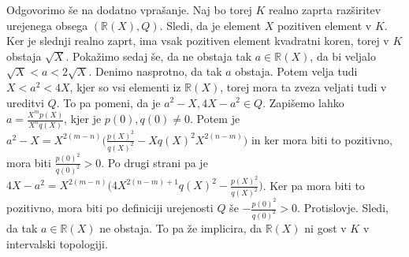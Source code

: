 \documentclass[a4paper, 12pt]{article}
\newcommand{\R}{\mathbb{R}}
\begin{document}
\begin{enumerate}
Odgovorimo še na dodatno vprašanje. Naj bo torej $K$ realno zaprta razširitev urejenega obsega $(\R(X), Q)$. Sledi, da je element $X$ pozitiven element v $K$. Ker je slednji realno zaprt, ima vsak pozitiven element kvadratni koren, torej v $K$ obstaja $\sqrt{X}$. Pokažimo sedaj še, da ne obstaja tak $a\in \R(X)$, da bi veljalo $\sqrt{X} < a <2\sqrt{X}$. Denimo nasprotno, da tak $a$ obstaja. Potem velja tudi $X < a^2 < 4 X$, kjer so vsi elementi iz $\R(X)$, torej mora ta zveza veljati tudi v ureditvi $Q$. To pa pomeni, da je $a^2 - X, 4X - a^2 \in Q$. Zapišemo lahko $a = \frac{X^m p(X)}{X^n q(X)}$, kjer je $p(0),q(0)\neq 0$. Potem je $a^2 - X = X^{2(m-n)} \big( \frac{p(X)^2}{q(X)^2} - Xq(X)^2 X^{2(n-m)}  \big)$ in ker mora biti to pozitivno, mora biti $\frac{p(0)^2}{q(0)^2} >0$. Po drugi strani pa je $4X-a^2 = X^{2(m-n)} \big( 4X^{2(n-m) + 1}q(X) ^2 - \frac{p(X)^2}{q(X)^2}  \big)$. Ker pa mora biti to pozitivno, mora biti po definiciji urejenosti $Q$ še $-\frac{p(0)^2}{q(0)^2} >0 $. Protislovje. Sledi, da tak $a\in \R(X)$ ne obstaja. To pa že implicira, da $\R(X)$ ni gost v $K$ v intervalski topologiji. 

\end{enumerate}
\end{document}
